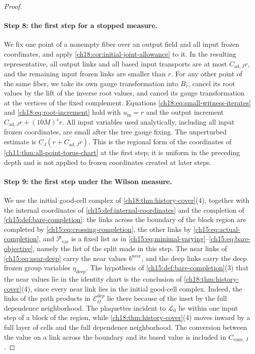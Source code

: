 \begin{proof}
\paragraph{Step 8: the first step for a stopped measure.}
We fix one point of a nonempty fiber over an output field and all input frozen coordinates, and apply \cref{ch18:cor:initial-joint-allowance} to it. In the resulting representative, all output links and all based input transports are at most $C_{\mathrm{ad},J}r$, and the remaining input frozen links are smaller than $r$. For any other point of the same fiber, we take its own gauge transformation into $B_r$, cancel its root values by the lift of the inverse root values, and cancel its gauge transformation at the vertices of the fixed complement. Equations \eqref{ch18:eq:small-witness-iterates} and \eqref{ch18:eq:root-increment} hold with $u_{\mathrm{in}}=r$ and the output increment $C_{\mathrm{ad},J}r+(10M)^sr$. All input variables used analytically, including all input frozen coordinates, are small after the tree gauge fixing. The unperturbed estimate is $C_J(r+C_{\mathrm{ad},J}r)$. This is the regional form of the coordinates of \cref{ch11:thm:all-point-torus-chart} at the first step; it is uniform in the preceding depth and is not applied to frozen coordinates created at later steps.

\paragraph{Step 9: the first step under the Wilson measure.}
We use the initial good-cell complex of \cref{ch18:thm:history-cover}(4), together with the internal coordinates of \cref{ch15:def:internal-coordinates} and the completion of \cref{ch15:def:bare-completion}: the links across the boundary of the block region are completed by \eqref{ch15:eq:crossing-completion}, the other links by \eqref{ch15:eq:actual-completion}, and $\mathcal P_{\mathrm{var}}$ is a fixed list as in \eqref{ch15:eq:minimal-varying}--\eqref{ch15:eq:bare-objective}, namely the list of the split made in this step. The near links of \eqref{ch15:eq:near-deep} carry the near values $b^{\mathrm{near}}$, and the deep links carry the deep frozen group variables $\eta_{\mathrm{deep}}$. The hypothesis of \cref{ch15:def:bare-completion}(3) that the near values lie in the identity chart is the conclusion of \cref{ch18:thm:history-cover}(4), since every near link lies in the initial good-cell complex. Indeed, the links of the path products in $\mathcal E^{\mathrm{dep}}_\Omega$ lie there because of the inset by the full dependence neighborhood. The plaquettes incident to $\mathcal L_0$ lie within one input step of a block of the region, while \cref{ch18:thm:history-cover}(4) moves inward by a full layer of cells and the full dependence neighborhood. The conversion between the value on a link across the boundary and its based value is included in $C_{\mathrm{conv},J}$.


\end{proof}
